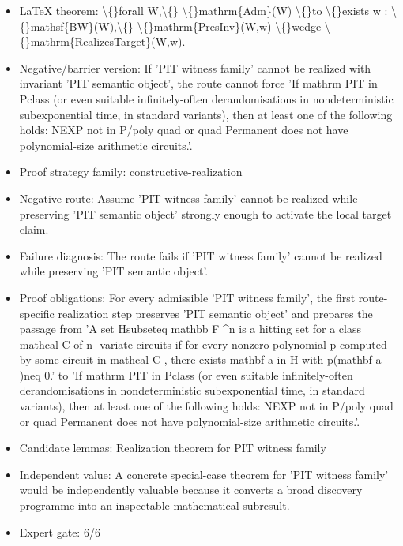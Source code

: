 \documentclass[11pt]{article}
\begin{document}
\begin{itemize}
\item LaTeX theorem: \textbackslash\{\}forall W,\textbackslash\{\} \textbackslash\{\}mathrm\{Adm\}(W) \textbackslash\{\}to \textbackslash\{\}exists w : \textbackslash\{\}mathsf\{BW\}(W),\textbackslash\{\} \textbackslash\{\}mathrm\{PresInv\}(W,w) \textbackslash\{\}wedge \textbackslash\{\}mathrm\{RealizesTarget\}(W,w).
\item Negative/barrier version: If 'PIT witness family' cannot be realized with invariant 'PIT semantic object', the route cannot force 'If mathrm PIT in Pclass (or even suitable infinitely-often derandomisations in nondeterministic subexponential time, in standard variants), then at least one of the following holds: NEXP not in P/poly quad or quad Permanent does not have polynomial-size arithmetic circuits.'.
\item Proof strategy family: constructive-realization
\item Negative route: Assume 'PIT witness family' cannot be realized while preserving 'PIT semantic object' strongly enough to activate the local target claim.
\item Failure diagnosis: The route fails if 'PIT witness family' cannot be realized while preserving 'PIT semantic object'.
\item Proof obligations: For every admissible 'PIT witness family', the first route-specific realization step preserves 'PIT semantic object' and prepares the passage from 'A set Hsubseteq mathbb F \textasciicircum{}n is a hitting set for a class mathcal C of n -variate circuits if for every nonzero polynomial p computed by some circuit in mathcal C , there exists mathbf a in H with p(mathbf a )neq 0.' to 'If mathrm PIT in Pclass (or even suitable infinitely-often derandomisations in nondeterministic subexponential time, in standard variants), then at least one of the following holds: NEXP not in P/poly quad or quad Permanent does not have polynomial-size arithmetic circuits.'.
\item Candidate lemmas: Realization theorem for PIT witness family
\item Independent value: A concrete special-case theorem for 'PIT witness family' would be independently valuable because it converts a broad discovery programme into an inspectable mathematical subresult.
\item Expert gate: 6/6
\end{itemize}
\end{document}

